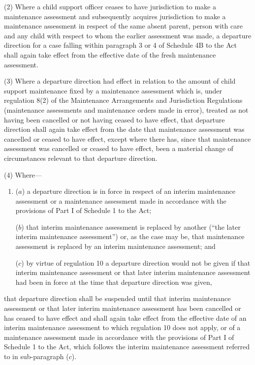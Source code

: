 \documentclass[a4paper]{article}
\begin{document}
(2) Where a child support officer ceases to have jurisdiction to make a
maintenance assessment and subsequently acquires jurisdiction to make a
maintenance assessment in respect of the same absent parent, person with care
and any child with respect to whom the earlier assessment was made, a departure
direction for a case falling within paragraph 3 or 4 of Schedule 4B to the Act
shall again take effect from the effective date of the fresh maintenance
assessment.

(3) Where a departure direction had effect in relation to the amount of child
support maintenance fixed by a maintenance assessment which is, under regulation
8(2) of the Maintenance Arrangements and Jurisdiction Regulations (maintenance
assessments and maintenance orders made in error), treated as not having been
cancelled or not having ceased to have effect, that departure direction shall
again take effect from the date that maintenance assessment was cancelled or
ceased to have effect, except where there has, since that maintenance assessment
was cancelled or ceased to have effect, been a material change of circumstances
relevant to that departure direction.

(4) Where—
\begin{enumerate}\item[]
($a$) a departure direction is in force in respect of an interim maintenance
assessment or a maintenance assessment made in accordance with the provisions of
Part I of Schedule 1 to the Act;

($b$) that interim maintenance assessment is replaced by another (“the later
interim maintenance assessment”) or, as the case may be, that maintenance
assessment is replaced by an interim maintenance assessment; and

($c$) by virtue of regulation 10 a departure direction would not be given if that
interim maintenance assessment or that later interim maintenance assessment had
been in force at the time that departure direction was given, 
\end{enumerate}
that departure
direction shall be suspended until that interim maintenance assessment or that
later interim maintenance assessment has been cancelled or has ceased to have
effect and shall again take effect from the effective date of an interim
maintenance assessment to which regulation 10 does not apply, or of a
maintenance assessment made in accordance with the provisions of Part I of
Schedule 1 to the Act, which follows the interim maintenance assessment referred
to in sub-paragraph ($c$).
\end{document}
